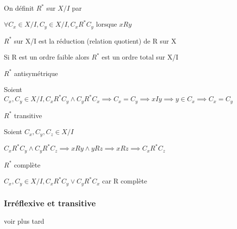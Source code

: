 \documentclass[a4paper, 12pt]{article}
\begin{document}
On définit $R^*$ sur $X/I$ par 

$\forall C_x \in X/I, C_y \in X/I, C_xR^*C_y \text{ lorsque } xRy$

$R^*$ sur X/I est la réduction (relation quotient) de R sur X

\begin{proposition}
    Si R est un ordre faible alors $R^*$ est un ordre total sur X/I
\end{proposition}

\begin{demonstration}
    \item $R^*$ antisymétrique
    
    Soient $C_x, C_y \in X/I, C_x R^* C_y \land C_y R^* C_x \implies C_x = C_y \implies xIy \implies y \in C_x \implies C_x = C_y$

    \item $R^*$ transitive
    
    Soient $C_x, C_y, C_z \in X/I$

    $C_x R^* C_y \land C_y R^* C_z \implies xRy \land yRz \implies xRz \implies C_x R^* C_z$


    \item $R^*$ complète
    
    $C_x, C_y \in X/I, C_xR^*C_y \lor C_yR^*C_x$
    car R complète
\end{demonstration}

\subsubsection{Irréflexive et transitive}

voir plus tard
\end{document}
